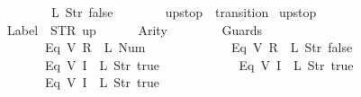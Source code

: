 \begin{isabellebody}
\ \ \ \ \ \ \ \ \ \ \ \ {\isacharparenleft}{}{\isacharcomma}\ {\isacharparenleft}L\ {\isacharparenleft}Str\ {\isacharprime}{\isacharprime}false{\isacharprime}{\isacharprime}{\isacharparenright}{\isacharparenright}{\isacharparenright}\isanewline
\ \ \ \ \ \ {\isacharbrackright}\isanewline
{\isasymrparr}{\isachardoublequoteclose}\isanewline
\isanewline
{}\isamarkupfalse%
\ {\isachardoublequoteopen}up{}{}stop{\isachardoublequoteclose}\ {\isacharcolon}{\isacharcolon}\ {\isachardoublequoteopen}transition{\isachardoublequoteclose}\ \isanewline
{\isachardoublequoteopen}up{}{}stop\ {\isasymequiv}\ {\isasymlparr}\isanewline
\ \ \ \ \ \ Label\ {\isacharequal}\ STR\ {\isacharprime}{\isacharprime}up{\isacharprime}{\isacharprime}{\isacharcomma}\isanewline
\ \ \ \ \ \ Arity\ {\isacharequal}\ {}{\isacharcomma}\isanewline
\ \ \ \ \ \ Guards\ {\isacharequal}\ {\isacharbrackleft}\isanewline
\ \ \ \ \ \ \ \ \ \ \ \ {\isacharparenleft}Eq\ {\isacharparenleft}V\ {\isacharparenleft}R\ {}{\isacharparenright}{\isacharparenright}\ {\isacharparenleft}L\ {\isacharparenleft}Num\ {}{\isacharparenright}{\isacharparenright}{\isacharparenright}{\isacharcomma}\isanewline
\ \ \ \ \ \ \ \ \ \ \ \ {\isacharparenleft}Eq\ {\isacharparenleft}V\ {\isacharparenleft}R\ {}{\isacharparenright}{\isacharparenright}\ {\isacharparenleft}L\ {\isacharparenleft}Str\ {\isacharprime}{\isacharprime}false{\isacharprime}{\isacharprime}{\isacharparenright}{\isacharparenright}{\isacharparenright}{\isacharcomma}\isanewline
\ \ \ \ \ \ \ \ \ \ \ \ {\isacharparenleft}Eq\ {\isacharparenleft}V\ {\isacharparenleft}I\ {}{\isacharparenright}{\isacharparenright}\ {\isacharparenleft}L\ {\isacharparenleft}Str\ {\isacharprime}{\isacharprime}true{\isacharprime}{\isacharprime}{\isacharparenright}{\isacharparenright}{\isacharparenright}{\isacharcomma}\isanewline
\ \ \ \ \ \ \ \ \ \ \ \ {\isacharparenleft}Eq\ {\isacharparenleft}V\ {\isacharparenleft}I\ {}{\isacharparenright}{\isacharparenright}\ {\isacharparenleft}L\ {\isacharparenleft}Str\ {\isacharprime}{\isacharprime}true{\isacharprime}{\isacharprime}{\isacharparenright}{\isacharparenright}{\isacharparenright}{\isacharcomma}\isanewline
\ \ \ \ \ \ \ \ \ \ \ \ {\isacharparenleft}Eq\ {\isacharparenleft}V\ {\isacharparenleft}I\ {}{\isacharparenright}{\isacharparenright}\ {\isacharparenleft}L\ {\isacharparenleft}Str\ {\isacharprime}{\isacharprime}true{\isacharprime}{\isacharprime}{\isacharparenright}{\isacharparenright}{\isacharparenright}\isanewline

\end{isabellebody}
